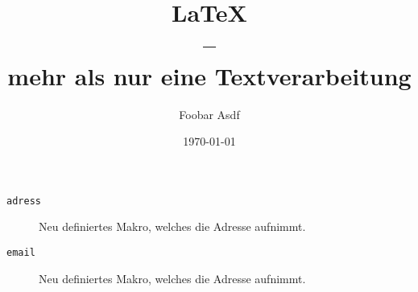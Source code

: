 \documentclass[a4paper,ngerman,12pt]{article}
\begin{document}
 

\date{\today}

\title{\LaTeX\\ -- \\[10pt] {\huge\textnormal{mehr als nur eine Textverarbeitung}}}

\author{Foobar Asdf}


\maketitle


\begin{description}
\item[\texttt{adress}] Neu definiertes Makro, welches die Adresse aufnimmt.
\item[\texttt{email}] Neu definiertes Makro, welches die Adresse aufnimmt.

\end{description}
\end{document}
